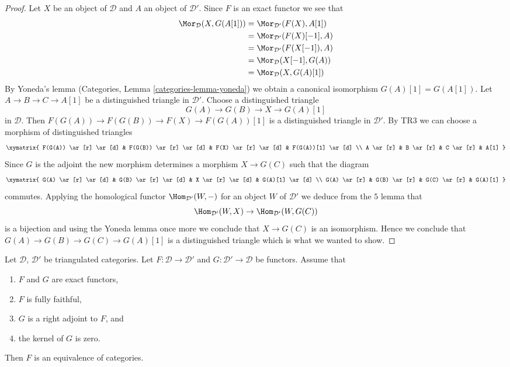 \begin{proof}
Let $X$ be an object of $\mathcal{D}$ and
$A$ an object of $\mathcal{D}'$. Since $F$ is an exact functor we see that
\begin{align*}
\Mor_\mathcal{D}(X, G(A[1]))
& =
\Mor_{\mathcal{D}'}(F(X), A[1]) \\
& =
\Mor_{\mathcal{D}'}(F(X)[-1], A) \\
& =
\Mor_{\mathcal{D}'}(F(X[-1]), A) \\
& =
\Mor_\mathcal{D}(X[-1], G(A)) \\
& =
\Mor_\mathcal{D}(X, G(A)[1])
\end{align*}
By Yoneda's lemma (Categories, Lemma \ref{categories-lemma-yoneda})
we obtain a canonical isomorphism $G(A)[1] = G(A[1])$.
Let $A \to B \to C \to A[1]$ be a distinguished triangle in $\mathcal{D}'$.
Choose a distinguished triangle
$$
G(A) \to G(B) \to X \to G(A)[1]
$$
in $\mathcal{D}$. Then $F(G(A)) \to F(G(B)) \to F(X) \to F(G(A))[1]$
is a distinguished triangle in $\mathcal{D}'$. By TR3 we can choose
a morphism of distinguished triangles
$$
\xymatrix{
F(G(A)) \ar[r] \ar[d] & F(G(B)) \ar[r] \ar[d] & F(X) \ar[r] \ar[d] &
F(G(A))[1] \ar[d] \\
A \ar[r] & B \ar[r] & C \ar[r] & A[1]
}
$$
Since $G$ is the adjoint the new morphism determines a morphism $X \to G(C)$
such that the diagram
$$
\xymatrix{
G(A) \ar[r] \ar[d] & G(B) \ar[r] \ar[d] & X \ar[r] \ar[d] & G(A)[1] \ar[d] \\
G(A) \ar[r] & G(B) \ar[r] & G(C) \ar[r] & G(A)[1]
}
$$
commutes. Applying the homological functor $\Hom_{\mathcal{D}'}(W, -)$
for an object $W$ of $\mathcal{D}'$ we deduce from the $5$ lemma that
$$
\Hom_{\mathcal{D}'}(W, X) \to \Hom_{\mathcal{D}'}(W, G(C))
$$
is a bijection and using the Yoneda lemma once more we conclude that
$X \to G(C)$ is an isomorphism. Hence we conclude that
$G(A) \to G(B) \to G(C) \to G(A)[1]$ is a distinguished triangle
which is what we wanted to show.
\end{proof}

\begin{lemma}
\label{lemma-fully-faithful-adjoint-kernel-zero}
Let $\mathcal{D}$, $\mathcal{D}'$ be triangulated categories.
Let $F : \mathcal{D} \to \mathcal{D}'$ and
$G : \mathcal{D}' \to \mathcal{D}$ be functors. Assume that
\begin{enumerate}
\item $F$ and $G$ are exact functors,
\item $F$ is fully faithful,
\item $G$ is a right adjoint to $F$, and
\item the kernel of $G$ is zero.
\end{enumerate}
Then $F$ is an equivalence of categories.
\end{lemma}

